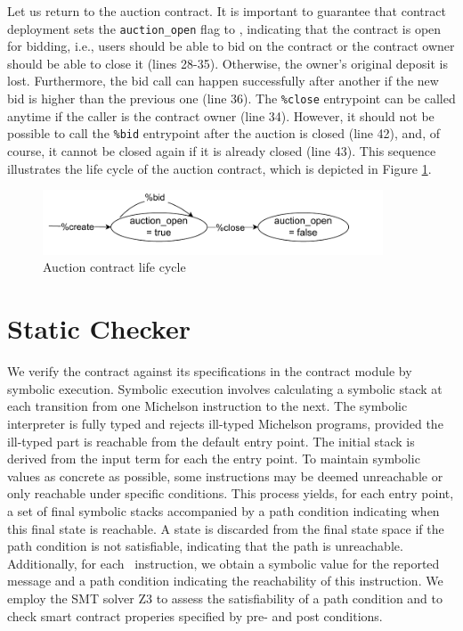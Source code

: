 \documentclass[a4paper,USenglish,cleveref, autoref,anonymous]{lipics-v2021}
\begin{document}
Let us return to the auction contract. It is important to guarantee
that contract deployment sets the  \lstinline/auction_open/ flag to
\TRUE, indicating that the contract is open for bidding, i.e., users
should be able to bid on the contract or the contract owner should be
able to close it (lines 28-35). Otherwise, the owner's original
deposit is lost. Furthermore, the bid call can happen
successfully after another if the new bid is higher than the previous
one (line 36). The  \lstinline/%close/ entrypoint can be called
anytime if the caller is the contract owner (line 34). However, it
should not be possible to call the  \lstinline/%bid/ entrypoint after
the auction is closed (line 42), and, of course, it cannot be closed
again if it is already closed (line 43). This sequence  illustrates
the life cycle of the auction contract, which is depicted in Figure
\ref{fig:auction-life-cycle}.

\begin{figure}[tp]
    \centering
    \includegraphics[width=0.9\textwidth]{auction}
    \caption{Auction contract life cycle}
    \label{fig:auction-life-cycle}
\end{figure}


\section{Static Checker}
\label{sec:static-checker-we}
We verify the contract against its specifications in the contract
module by symbolic execution. Symbolic execution involves calculating
a symbolic stack at each transition from one Michelson instruction to
the next. The symbolic interpreter is fully typed and rejects
ill-typed Michelson programs, provided the ill-typed part is reachable
from the default entry point.  The initial stack is derived from the
input term for each the entry point. To maintain symbolic values as
concrete as possible, some instructions may be deemed unreachable or
only reachable under specific conditions. This process yields, for
each entry point, a set of final symbolic stacks accompanied by a path
condition indicating when this final state is reachable. A state is
discarded from the final state space if the path condition is not
satisfiable, indicating that the path is unreachable. Additionally,
for each \FAILWITH\ instruction, we obtain a symbolic value for the
reported message and a path condition indicating the reachability of
this instruction. We employ the SMT solver Z3  to assess the
satisfiability of a path condition and to check smart contract
properies specified by pre- and post conditions.
\end{document}
